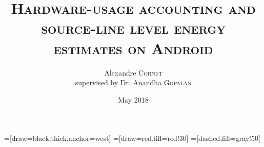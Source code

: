 
\title[Project presentation]{\textsc{Hardware-usage accounting and source-line level energy estimates on Android}}
\author{Alexandre \textsc{Cornet}\\ {\footnotesize supervised by Dr. Anandha \textsc{Gopalan}}}
\date{May 2018}

=[draw=black,thick,anchor=west]
=[draw=red,fill=red!30]
=[dashed,fill=gray!50]
\begin{frame}
\titlepage
{}
\end{frame}
%

%
%
